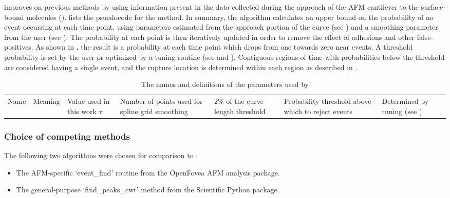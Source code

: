 \name{} improves on previous methods by using information present in the data collected during the approach of the AFM cantilever to the surface-bound molecules ().   lists the psuedocode for the method. In summary, the algorithm calculates an upper bound on the probability of no event occurring at each time point, using parameters estimated from the approach portion of the curve (see ) and a smoothing parameter from the user (see ). The probability at each point is then iteratively updated in order to remove the effect of adhesions and other false-positives. As shown in , the result is a probability at each time point which drops from one towards zero near events. A threshold probability is set by the user or optimized by a tuning routine (see  and ). Contiguous regions of time with probabilities below the threshold are considered having a single event, and the rupture location is determined within each region as described in .


\begin{table}
\begin{tabularx}{\textwidth}{ l | l | l | l  }
\hline \hline
Name & Meaning  & Value used in this work \e
$\tau$ & Number of points used for spline grid smoothing & 2\% of the curve length \e
threshold & Probability threshold above which to reject events  & Determined by tuning (see ) \e
\end{tabularx}
\caption[Algorithm parameters]{ The names and definitions of the parameters used by \name{}}
\end{table}


\subsubsection{Choice of competing methods}

\firstp The following two algorithms were chosen for comparison to \name{}: \pl

\begin{itemize}
\item The AFM-specific `event\_find' routine from the OpenFovea AFM analysis package.\cite{roduit_openfovea:_2012}
\item The general-purpose `find\_peaks\_cwt' method from the Scientific Python package.\cite{Jones_SciPy:_2001}
\end{itemize}


